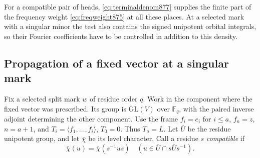 \documentclass[a4paper,11pt]{article}
\theoremstyle{definition}
\theoremstyle{remark}
\numberwithin{equation}{section}
\begin{document}
For a compatible pair of heads, \eqref{eq:terminaldenom877}
supplies the finite part of the frequency weight
\eqref{eq:freqweight875} at all these places. At a selected mark
with a singular minor the test also contains the signed unipotent
orbital integrals, so their Fourier coefficients have to be
controlled in addition to this density.
\clearpage

\subsection{Propagation of a fixed vector at a singular mark}
\label{sec:singularflag878}

Fix a selected split mark \(w\) of residue order \(q\). Work in the
component where the fixed vector was prescribed. Its group is
\(\mathrm{GL}(V)\) over \(\mathbb F_q\), with the paired inverse adjoint
determining the other component. Use the frame \(f_i=e_i\) for \(i\le a\),
\(f_n=z\), \(n=a+1\), and \(T_i=\langle f_1,\ldots,f_i\rangle\),
\(T_0=0\). Thus \(T_a=L\). Let \(\bar U\) be the residue unipotent group,
and let \(\bar\chi\) be its level character. Call a residue \(s\)
\emph{compatible} if
\[
 \bar\chi(u)=\bar\chi(s^{-1}u s)
           \quad(u\in\bar U\cap s\bar U s^{-1}).
\]
\end{document}
